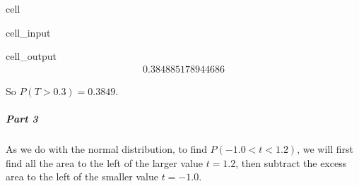 \documentclass[letterpaper,10pt,english]{jupyterBook}
\begin{document}
\begin{sphinxuseclass}{cell}\begin{sphinxVerbatimInput}

\begin{sphinxuseclass}{cell_input}
\begin{sphinxVerbatim}[commandchars=\\\{\}]
\end{sphinxVerbatim}

\end{sphinxuseclass}\end{sphinxVerbatimInput}
\begin{sphinxVerbatimOutput}

\begin{sphinxuseclass}{cell_output}\begin{equation*}
\begin{split}0.384885178944686\end{split}
\end{equation*}
\end{sphinxuseclass}\end{sphinxVerbatimOutput}

\end{sphinxuseclass}
\sphinxAtStartPar
So \(P(T > 0.3) = 0.3849\).


\subparagraph{Part 3}
\label{\detokenize{Ch5 Confidence Intervals/5.3 Student's t-Distribution:part-3}}
\sphinxAtStartPar
As we do with the normal distribution, to find \(P(-1.0 < t < 1.2)\), we will first find all the area to the left of the larger value \(t = 1.2\), then subtract the excess area to the left of the smaller value \(t = -1.0\).
\end{document}

